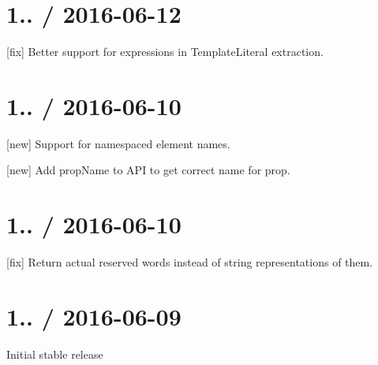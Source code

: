 \section*{1.. / 2016-\/06-\/12 }


\begin{DoxyItemize}
\item \mbox{[}fix\mbox{]} Better support for expressions in {\ttfamily Template\+Literal} extraction.
\end{DoxyItemize}

\section*{1.. / 2016-\/06-\/10 }


\begin{DoxyItemize}
\item \mbox{[}new\mbox{]} Support for namespaced element names.
\item \mbox{[}new\mbox{]} Add {\ttfamily prop\+Name} to A\+PI to get correct name for prop.
\end{DoxyItemize}

\section*{1.. / 2016-\/06-\/10 }


\begin{DoxyItemize}
\item \mbox{[}fix\mbox{]} Return actual reserved words instead of string representations of them.
\end{DoxyItemize}

\section*{1.. / 2016-\/06-\/09 }


\begin{DoxyItemize}
\item Initial stable release 
\end{DoxyItemize}